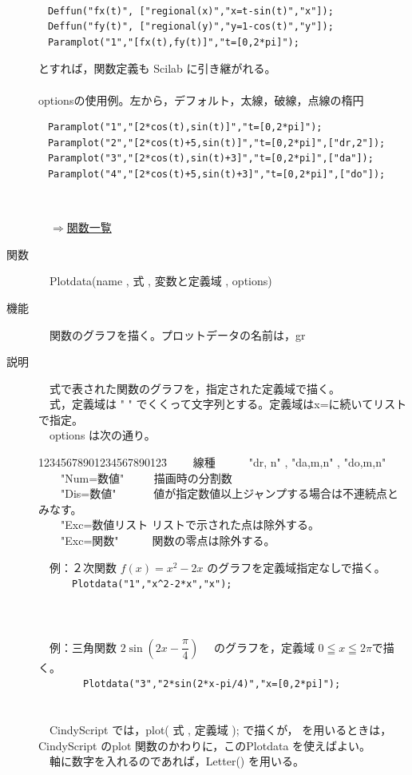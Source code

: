 \documentclass[papersize,a4paper,12pt,uplatex]{jsarticle}
\begin{document}
\begin{description}
\\
\begin{verbatim}
　Deffun("fx(t)", ["regional(x)","x=t-sin(t)","x"]);
　Deffun("fy(t)", ["regional(y)","y=1-cos(t)","y"]);
　Paramplot("1","[fx(t),fy(t)]","t=[0,2*pi]");
\end{verbatim}
とすれば，関数定義も Scilab に引き継がれる。\\
　\\
optionsの使用例。左から，デフォルト，太線，破線，点線の楕円
\begin{verbatim}
　Paramplot("1","[2*cos(t),sin(t)]","t=[0,2*pi]");
　Paramplot("2","[2*cos(t)+5,sin(t)]","t=[0,2*pi]",["dr,2"]);
　Paramplot("3","[2*cos(t),sin(t)+3]","t=[0,2*pi]",["da"]);
　Paramplot("4","[2*cos(t)+5,sin(t)+3]","t=[0,2*pi]",["do"]);
\end{verbatim}

\\

\begin{flushright}　\hyperlink{functionlist}{$\Rightarrow$関数一覧}\end{flushright}

\hypertarget{plotdata}{}
\item[関数]　Plotdata(name , 式 , 変数と定義域 , options)
\item[機能]　関数のグラフを描く。プロットデータの名前は，gr
\item[説明]　式で表された関数のグラフを，指定された定義域で描く。\\
　式，定義域は " " でくくって文字列とする。定義域はx=に続いてリストで指定。\\
　options は次の通り。
\begin{tabbing}
12345678901234567890123\=\kill
　　線種　　　\>"dr, n"  , "da,m,n" , "do,m,n"\\
　　"Num=数値" 　　 \>描画時の分割数\\
　　"Dis=数値"　　　 \>値が指定数値以上ジャンプする場合は不連続点とみなす。\\
　　"Exc=数値リスト \>リストで示された点は除外する。\\
　　"Exc=関数"　　　\>関数の零点は除外する。\\
\end{tabbing}
　例：２次関数 $f(x)=x^2-2x$ のグラフを定義域指定なしで描く。\\
　　　\verb|Plotdata("1","x^2-2*x","x");|\\
　\\
　　
　\\
　\\
　例：三角関数 $2\sin \left(2x-\dfrac{\pi}{4} \right)$ 　のグラフを，定義域 $0 \leqq x \leqq 2 \pi$で描く。\\
　　　　\verb|Plotdata("3","2*sin(2*x-pi/4)","x=[0,2*pi]");|\\
　\\
　　　　
　\\
　CindyScript では，plot( 式 , 定義域 ); で描くが， \ketcindy  を用いるときは，CindyScript のplot 関数のかわりに，このPlotdata を使えばよい。\\
　軸に数字を入れるのであれば，Letter() を用いる。\\


\end{description}
\end{document}
